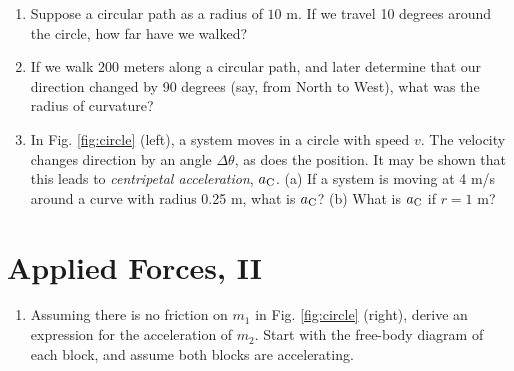 \documentclass{article}
\begin{document}
\begin{enumerate}
\item Suppose a circular path as a radius of $10$ m.  If we travel 10 degrees around the circle, how far have we walked? \\ \vspace{0.5cm}
\item If we walk $200$ meters along a circular path, and later determine that our direction changed by 90 degrees (say, from North to West), what was the radius of curvature? \\ \vspace{0.5cm} 
\item In Fig. \ref{fig:circle} (left), a system moves in a circle with speed $v$.  The velocity changes direction by an angle $\Delta\theta$, as does the position.  It may be shown that this leads to \textit{centripetal acceleration}, $a_{\rm C}$.  (a) If a system is moving at 4 m/s around a curve with radius 0.25 m, what is $a_{\rm C}$? (b) What is $a_{\rm C}$ if $r = 1$ m?
\end{enumerate}

\section{Applied Forces, II}

\begin{enumerate}
\item Assuming there is no friction on $m_1$ in Fig. \ref{fig:circle} (right), derive an expression for the acceleration of $m_2$.  Start with the free-body diagram of each block, and assume both blocks are accelerating.
\end{enumerate}
\end{document}
